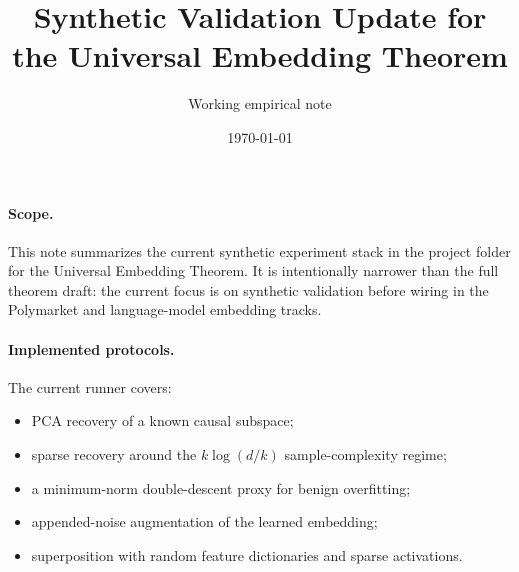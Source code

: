 \documentclass[11pt]{article}
\title{Synthetic Validation Update for the Universal Embedding Theorem}
\author{Working empirical note}
\date{\today}
\begin{document}
\maketitle

\paragraph{Scope.}
This note summarizes the current synthetic experiment stack in the
project folder for the Universal Embedding Theorem. It is intentionally narrower than the
full theorem draft: the current focus is on synthetic validation before wiring
in the Polymarket and language-model embedding tracks.

\paragraph{Implemented protocols.}
The current runner covers:
\begin{itemize}
  \item PCA recovery of a known causal subspace;
  \item sparse recovery around the $k \log(d / k)$ sample-complexity regime;
  \item a minimum-norm double-descent proxy for benign overfitting;
  \item appended-noise augmentation of the learned embedding;
  \item superposition with random feature dictionaries and sparse activations.
\end{itemize}

\end{document}
